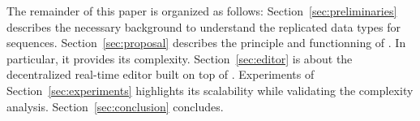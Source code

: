 The remainder of this paper is organized as follows:
Section~\ref{sec:preliminaries} describes the necessary background to understand
the replicated data types for sequences. Section~\ref{sec:proposal} describes
the principle and functionning of \LSEQ. In particular, it provides its
complexity. Section~\ref{sec:editor} is about the decentralized real-time editor
built on top of \LSEQ. Experiments of Section~\ref{sec:experiments} highlights
its scalability while validating the complexity analysis.
Section~\ref{sec:conclusion} concludes.

